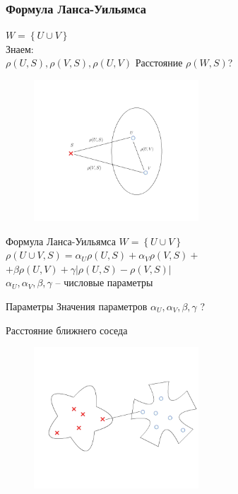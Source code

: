 \documentclass[10pt]{beamer}
\begin{document}
\begin{frame}\frametitle{Формула Ланса-Уильямса}
	\begin{minipage}[t]{0.45\linewidth}
    \vspace{15mm}
 		${ W = \left\{ U \cup V \right\} }$\\	
		\bigbreak		
		\alert{Знаем}:\\
		${\rho(U, S), \rho(V, S), \rho(U, V)}$
		\bigbreak				
		Расстояние $\rho(W, S)$?\\	
	\end{minipage}%
	\begin{minipage}[t]{0.55\linewidth}
	  \begin{figure}[htbp]
	    \includegraphics[height=150pt, keepaspectratio = true]{images/lans-formula}  
	  \end{figure}
  \end{minipage}%
\end{frame}

\begin{frame}{Формула Ланса-Уильямса}
	${ W = \left\{ U \cup V \right\} }$\\
	\bigbreak
	${\rho(U \cup V, S) = \alpha_U \rho(U, S) + \alpha_V \rho(V, S) + }$ \\
	\hspace{30mm} ${ + \beta \rho(U, V) + \gamma \vert \rho(U, S) - \rho(V, S)\vert}$\\
	\bigbreak
	${\alpha_U, \alpha_V, \beta, \gamma}$ -- числовые параметры
\end{frame}

\begin{frame}{Параметры}
	Значения параметров
	${\alpha_U, \alpha_V, \beta, \gamma}$ ?
\end{frame}

\begin{frame}{Расстояние ближнего соседа}
	\begin{figure}[htbp]
	  \includegraphics[height=150pt, keepaspectratio = true]{images/lans1}  
	\end{figure}
\end{frame}
\end{document}
